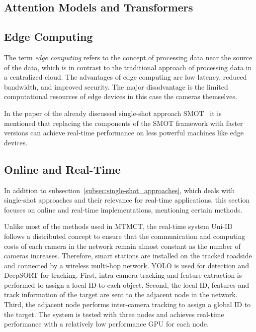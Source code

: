 \subsection{Attention Models and Transformers}\label{subsec:attention_models_and_transformers}


\subsection{Edge Computing}\label{subsec:edge_computing}
The term \textit{edge computing} refers to the concept of processing data near the source of the data, which is in contrast to the traditional approach of processing data in a centralized cloud. The advantages of edge computing are low latency, reduced bandwidth, and improved security. The major disadvantage is the limited computational resources of edge devices in this case the cameras themselves.

In the paper of the already discussed single-shot approach SMOT~\cite{Li20} it is mentioned that replacing the components of the SMOT framework with faster versions can achieve real-time performance on less powerful machines like edge devices.

\subsection{Online and Real-Time}\label{subsec:online_and_real-time}
In addition to subsection~\ref{subsec:single-shot_approaches}, which deals with single-shot approaches and their relevance for real-time applications, this section focuses on online and real-time implementations, mentioning certain methods.

Unlike most of the methods used in MTMCT, the real-time system Uni-ID~\cite{Chen22} follows a distributed concept to ensure that the communication and computing costs of each camera in the network remain almost constant as the number of cameras increases. Therefore, smart stations are installed on the tracked roadside and connected by a wireless multi-hop network. YOLO is used for detection and DeepSORT for tracking. First, intra-camera tracking and feature extraction is performed to assign a local ID to each object. Second, the local ID, features and track information of the target are sent to the adjacent node in the network. Third, the adjacent node performs inter-camera tracking to assign a global ID to the target. The system is tested with three nodes and achieves real-time performance with a relatively low performance GPU for each node.

